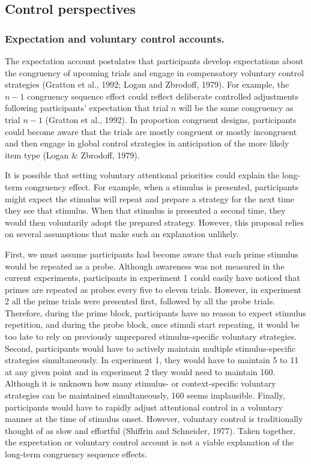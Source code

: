\documentclass[]{DissertateCUNY}
\begin{document}
\hypertarget{control-perspectives}{%
\subsection{Control perspectives}\label{control-perspectives}}

\hypertarget{expectation-and-voluntary-control-accounts.}{%
\subsubsection{Expectation and voluntary control
accounts.}\label{expectation-and-voluntary-control-accounts.}}

The expectation account postulates that participants develop
expectations about the congruency of upcoming trials and engage in
compensatory voluntary control strategies (Gratton et al., 1992; Logan
and Zbrodoff, 1979). For example, the \(n-1\) congruency sequence effect
could reflect deliberate controlled adjustments following participants'
expectation that trial \(n\) will be the same congruency as trial
\(n-1\) (Gratton et al., 1992). In proportion congruent designs,
participants could become aware that the trials are mostly congruent or
mostly incongruent and then engage in global control strategies in
anticipation of the more likely item type (Logan \& Zbrodoff, 1979).

It is possible that setting voluntary attentional priorities could
explain the long-term congruency effect. For example, when a stimulus is
presented, participants might expect the stimulus will repeat and
prepare a strategy for the next time they see that stimulus. When that
stimulus is presented a second time, they would then voluntarily adopt
the prepared strategy. However, this proposal relies on several
assumptions that make such an explanation unlikely.

First, we must assume participants had become aware that each prime
stimulus would be repeated as a probe. Although awareness was not
measured in the current experiments, participants in experiment 1 could
easily have noticed that primes are repeated as probes every five to
eleven trials. However, in experiment 2 all the prime trials were
presented first, followed by all the probe trials. Therefore, during the
prime block, participants have no reason to expect stimulus repetition,
and during the probe block, once stimuli start repeating, it would be
too late to rely on previously unprepared stimulus-specific voluntary
strategies. Second, participants would have to actively maintain
multiple stimulus-specific strategies simultaneously. In experiment 1,
they would have to maintain 5 to 11 at any given point and in experiment
2 they would need to maintain 160. Although it is unknown how many
stimulus- or context-specific voluntary strategies can be maintained
simultaneously, 160 seems implausible. Finally, participants would have
to rapidly adjust attentional control in a voluntary manner at the time
of stimulus onset. However, voluntary control is traditionally thought
of as slow and effortful (Shiffrin and Schneider, 1977). Taken together,
the expectation or voluntary control account is not a viable explanation
of the long-term congruency sequence effects.
\end{document}

